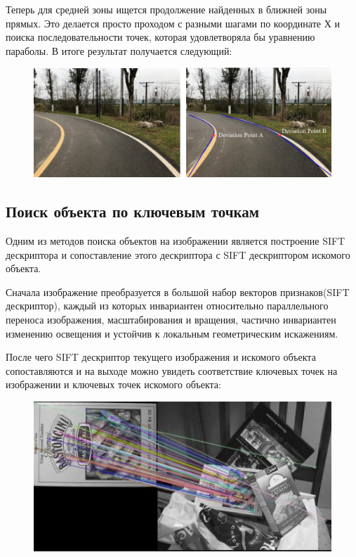 Теперь для средней зоны ищется продолжение найденных в ближней зоны прямых.
Это делается просто проходом с разными шагами по координате Х и поиска последовательности точек, которая удовлетворяла бы уравнению параболы. В итоге результат получается следующий:
\begin{figure}[h!]
	\centering
	\includegraphics[width=1\linewidth]{pictures/screenshot029}
	\caption{}
	\label{fig:screenshot029}
\end{figure}

\subsection{Поиск объекта по ключевым точкам}
Одним из методов поиска объектов на изображении является построение SIFT\cite{b:SIFT} дескриптора и сопоставление этого дескриптора с SIFT дескриптором искомого объекта.

Сначала изображение преобразуется в большой набор векторов признаков(SIFT дескриптор), каждый из которых инвариантен относительно параллельного переноса изображения, масштабирования и вращения, частично инвариантен изменению освещения и устойчив к локальным геометрическим искажениям.

После чего SIFT дескриптор текущего изображения и искомого объекта сопоставляются и на выходе можно увидеть соответствие ключевых точек на изображении и ключевых точек искомого объекта:
\begin{figure}[!h]
	\centering
	\includegraphics[width=1\linewidth]{pictures/screenshot011}
	\caption{}
	\label{fig:screenshot011}
\end{figure}

